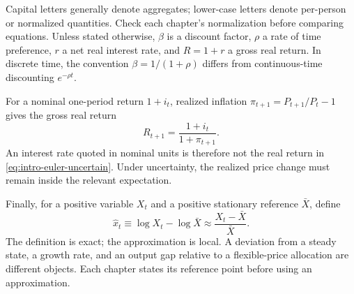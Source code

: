 Capital letters generally denote aggregates; lower-case letters denote
per-person or normalized quantities. Check each chapter's normalization before
comparing equations. Unless stated otherwise, $\beta$ is a discount
factor, $\rho$ a rate of time preference, $r$ a net real interest rate, and
$R=1+r$ a gross real return. In discrete time, the convention
$\beta=1/(1+\rho)$ differs from continuous-time discounting $e^{-\rho t}$.

For a nominal one-period return $1+i_t$, realized inflation
$\pi_{t+1}=P_{t+1}/P_t-1$ gives the gross real return
\begin{equation}
R_{t+1}=\frac{1+i_t}{1+\pi_{t+1}}.
\end{equation}
An interest rate quoted in nominal units is therefore not the real return in
\eqref{eq:intro-euler-uncertain}. Under uncertainty, the realized price change
must remain inside the relevant expectation.

Finally, for a positive variable $X_t$ and a positive stationary reference
$\bar X$, define
\begin{equation}
\hat x_t\equiv\log X_t-\log\bar X
\approx\frac{X_t-\bar X}{\bar X}.
\end{equation}
The definition is exact; the approximation is local. A deviation from a steady
state, a growth rate, and an output gap relative to a flexible-price allocation
are different objects. Each chapter states its reference point before using
an approximation.
